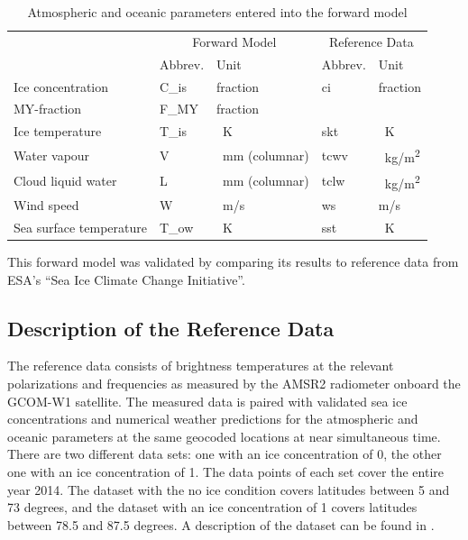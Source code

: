 \documentclass[11pt, a4paper]{article}
\begin{document}
\begin{table}[h!]
\centering
\begin{tabular}{@{}p{4cm} p{1.8cm}p{2.8cm}p{1.8cm}p{1.8cm}@{}}
\tabularnewline
& \multicolumn{2}{c}{Forward Model} & \multicolumn{2}{c}{Reference Data}
\tabularnewline
\cmidrule(r{1em}){2-3} \cmidrule(l{1em}){4-5}
& Abbrev. & Unit & Abbrev. & Unit
\tabularnewline
\midrule
Ice concentration	& C\_is	& fraction		& ci	& fraction	\\
MY-fraction		& F\_MY	& fraction		& 	& 		\\
Ice temperature		& T\_is	& \SI{}{K}	& skt	& \SI{}{K}	\\
Water vapour		& V	& \SI{}{mm} (columnar)	& tcwv	& \SI{}{kg/m^2}	\\
Cloud liquid water	& L	& \SI{}{mm} (columnar)	& tclw	& \SI{}{kg/m^2}	\\
Wind speed		& W	& \SI{}{m/s}		& ws	& m/s		\\
Sea surface temperature	& T\_ow	& \SI{}{K}	& sst	& \SI{}{K}	\\
\midrule
\end{tabular}
\caption{Atmospheric and oceanic parameters entered into the forward model}
\label{tab:input_parameters}
\end{table}

This forward model was validated by comparing its results to reference data from ESA's ``Sea Ice Climate Change Initiative''.



\subsection{Description of the Reference Data}

The reference data consists of brightness temperatures at the relevant polarizations and frequencies as measured by the AMSR2 radiometer onboard the GCOM-W1 satellite. The measured data is paired with validated sea ice concentrations and numerical weather predictions for the atmospheric and oceanic parameters at the same geocoded locations at near simultaneous time. There are two different data sets: one with an ice concentration of 0, the other one with an ice concentration of 1. The data points of each set cover the entire year 2014. The dataset with the no ice condition covers latitudes between 5 and 73 degrees, and the dataset with an ice concentration of 1 covers latitudes between 78.5 and 87.5 degrees. A description of the dataset can be found in \cite{Wink2}.
\end{document}
